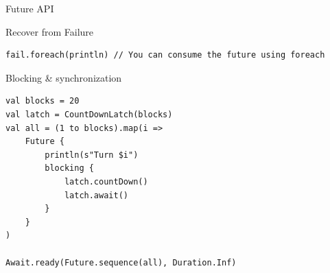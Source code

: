 \documentclass[presentation, 9pt]{beamer}\mode<presentation>{\usetheme{AMSBolognaFC}}
\begin{document}
\begin{frame}{Future API}
\begin{alertblock}{Recover from Failure}
\begin{tcolorbox}[left=0pt, top=0pt, bottom=0pt]
\begin{verbatim}
fail.foreach(println) // You can consume the future using foreach
		\end{verbatim}
	\end{tcolorbox}
\end{alertblock}
\begin{alertblock}{Blocking \& synchronization}
	\begin{tcolorbox}[left=0pt, top=0pt, bottom=0pt]
		\begin{verbatim}
val blocks = 20
val latch = CountDownLatch(blocks)
val all = (1 to blocks).map(i =>
	Future {
		println(s"Turn $i")
		blocking {
			latch.countDown()
			latch.await()
		}
	}
)

Await.ready(Future.sequence(all), Duration.Inf)
		\end{verbatim}
	\end{tcolorbox}
\end{alertblock}
\end{frame}
\end{document}
